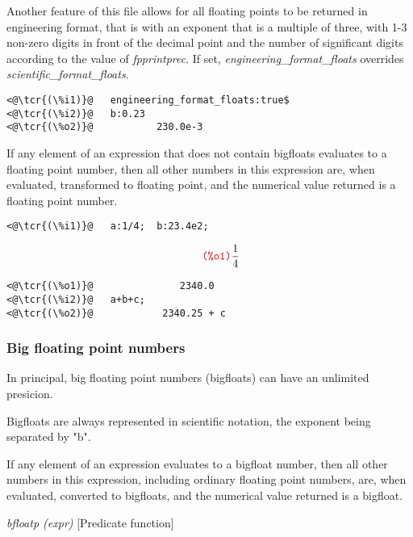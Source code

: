 \documentclass[../Maxima_Workbook.tex]{subfiles}
\begin{document}
Another feature of this file allows for all floating points to be returned in engineering format, that is with an exponent that is a multiple of three, with 1-3 non-zero digits in front of the decimal point and the number of significant digits according to the value of \emph{fpprintprec}. If set, \emph{engineering\_format\_floats} overrides \emph{scientific\_format\_floats}.

\begin{lstlisting}
<@\tcr{(\%i1)}@   engineering_format_floats:true$
<@\tcr{(\%i2)}@   b:0.23
<@\tcr{(\%o2)}@			  230.0e-3
\end{lstlisting}

If any element of an expression that does not contain bigfloats evaluates to a floating point number, then all other numbers in this expression are, when evaluated, transformed to floating point, and the numerical value returned is a floating point number.

\lz \begin{small}
	\color{blue} \leqn
\begin{lstlisting}
<@\tcr{(\%i1)}@   a:1/4;  b:23.4e2; 
\end{lstlisting}
\vspace{-4mm} \[\tag*{\tcr{\ttfamily (\%o1)}} \frac{1}{4} \]
\vspace{-6mm} \begin{lstlisting}
<@\tcr{(\%o1)}@			      2340.0
<@\tcr{(\%i2)}@   a+b+c;	
<@\tcr{(\%o2)}@			   2340.25 + c
\end{lstlisting}
\color{black} \reqn
\end{small} \vspace{-4mm}

\subsubsection{Big floating point numbers}

In principal, big floating point numbers (bigfloats) can have an unlimited presicion. 

\lz Bigfloats are always represented in scientific notation, the exponent being separated by "b".

\lz If any element of an expression evaluates to a bigfloat number, then all other numbers in this expression, including ordinary floating point numbers, are, when evaluated, converted to bigfloats, and the numerical value returned is a bigfloat.

\lzz \emph{bfloatp (expr)} \hfill [Predicate function]
\end{document}
